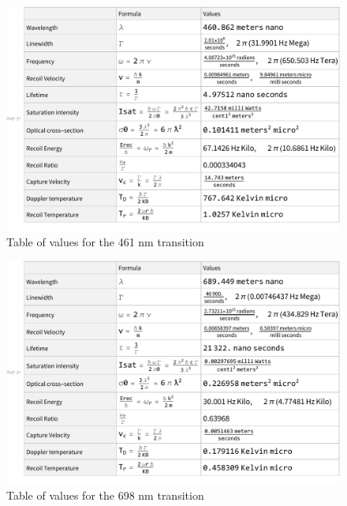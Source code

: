 \documentclass[../../main.tex]{subfiles}
\begin{document}
\begin{figure}[H]
    \includegraphics[width=\linewidth]{461table2}
    \caption{Table of values for the 461 nm transition}
\end{figure}
\begin{figure}[H]
    \includegraphics[width=\linewidth]{689table2}
    \caption{Table of values for the 698 nm transition}
\end{figure}
\end{document}
